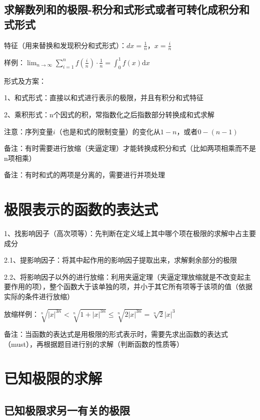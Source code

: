 \subsection{求解数列和的极限-积分和式形式或者可转化成积分和式形式}

特征（用来替换和发现积分和式形式）：$dx=\frac{1}{n}$，$x=\frac{i}{n}$

样例：$\lim _{n \rightarrow \infty} \sum_{i=1}^{n} f\left(\frac{i}{n}\right) \cdot \frac{1}{n}=\int_{0}^{1} f(x) \mathrm{d} x$

形式及方案：

1、和式形式：直接以和式进行表示的极限，并且有积分和式特征

2、乘积形式：n个因式的积，常指数化之后指数部分转换成和式求解

注意：序列变量$i$（也是和式的限制变量）的变化从$1-n$，或者$0-(n-1)$

备注：有时需要进行放缩（夹逼定理）才能转换成积分和式（比如两项相乘而不是n项相乘）

备注：有时和式的两项是分离的，需要进行并项处理



\section{极限表示的函数的表达式}

1、找影响因子（高次项等）：先判断在定义域上其中哪个项在极限的求解中占主要成分

2.1、提影响因子：将其中起作用的影响因子提取出来，求解剩余部分的极限

2.2、将影响因子以外的进行放缩：利用夹逼定理（夹逼定理放缩就是不改变起主要作用的项），整个函数大于该单独的项，并小于其它所有项等于该项的值（依据实际的条件进行放缩）

放缩样例：$\sqrt[n]{|x|^{3 n}}<\sqrt[n]{1+|x|^{3 n}} \leqslant \sqrt[n]{2|x|^{3 n}}=\sqrt[n]{2}|x|^{3}$

备注：当函数的表达式是用极限的形式表示时，需要先求出函数的表达式（must），再根据题目进行别的求解（判断函数的性质等）

\section{已知极限的求解}



\subsection{已知极限求另一有关的极限}

